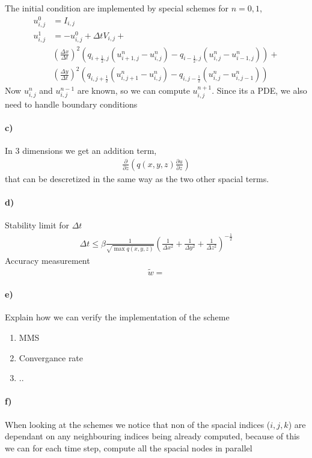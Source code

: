 \documentclass[11pt,a4paper]{article}
\begin{document}
The initial condition are implemented by special schemes for $n = 0,1$,
\begin{align}
u^0_{i,j} &= I_{i,j} \\
 u^1_{i,j} &= -u^0_{i,j} + \Delta t V_{i,j} + \\
& \left(\frac{\Delta x}{\Delta t} \right)^2 \left(q_{i+\frac{1}{2},j}(u^n_{i+1,j}-u^n_{i,j})-q_{i-\frac{1}{2},j}(u^n_{i,j}-u^n_{i-1,j})\right)+ \\
& \left(\frac{\Delta y}{\Delta t} \right)^2\left(q_{i,j+\frac{1}{2}}(u^n_{i,j+1}-u^n_{i,j})-q_{i,j-\frac{1}{2}}(u^n_{i,j}-u^n_{i,j-1})\right)
\end{align}
Now $u^{n}_{i,j}$ and $u^{n-1}_{i,j}$ are known, so we can compute $u^{n+1}_{i,j}$. Since its a PDE, we also need to handle boundary conditions
\paragraph*{c)}
In 3 dimensions we get an addition term,
\begin{align*}
\frac{\partial}{\partial z} \left(q(x,y,z)\frac{\partial u}{\partial z}\right)
\end{align*}
that can be descretized in the same way as the two other spacial terms.

\paragraph*{d)}
Stability limit for $\Delta t$
\begin{align}
\Delta t \leqslant \beta \frac{1}{\sqrt{\max q(x,y,z)}}\left(\frac{1}{\Delta x^2}+\frac{1}{\Delta y^2}+\frac{1}{\Delta z^2}\right)^{-\frac{1}{2}}
\end{align}
Accuracy measurement
\begin{align}
\widetilde{w} = 
\end{align}
\paragraph*{e)}
Explain how we can verify the implementation of the scheme
\begin{enumerate}
\item MMS
\item Convergance rate
\item ..
\end{enumerate}

\paragraph*{f)}
When looking at the schemes we notice that non of the spacial indices ($i,j,k$) are dependant on any neighbouring indices being already computed, because of this we can for each time step, compute all the spacial nodes in parallel
\end{document}
